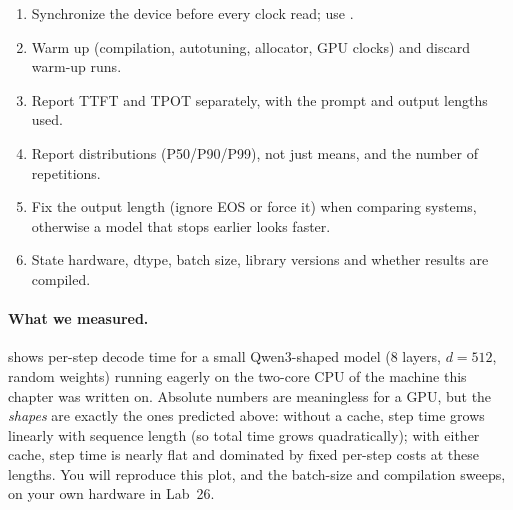 \begin{keyidea}
\begin{enumerate}
  \item Synchronize the device before every clock read; use .
  \item Warm up (compilation, autotuning, allocator, GPU clocks) and discard warm-up runs.
  \item Report TTFT and TPOT separately, with the prompt and output lengths used.
  \item Report distributions (P50/P90/P99), not just means, and the number of repetitions.
  \item Fix the output length (ignore EOS or force it) when comparing systems, otherwise a model
    that stops earlier looks faster.
  \item State hardware, dtype, batch size, library versions and whether results are compiled.
\end{enumerate}
\end{keyidea}

\paragraph{What we measured.}  shows per-step decode time for a small
Qwen3-shaped model (8 layers, $d=512$, random weights) running eagerly on the two-core CPU of the
machine this chapter was written on. Absolute numbers are meaningless for a GPU, but the
\emph{shapes} are exactly the ones predicted above: without a cache, step time grows linearly with
sequence length (so total time grows quadratically); with either cache, step time is nearly flat
and dominated by fixed per-step costs at these lengths. You will reproduce this plot, and the
batch-size and compilation sweeps, on your own hardware in Lab~26.

